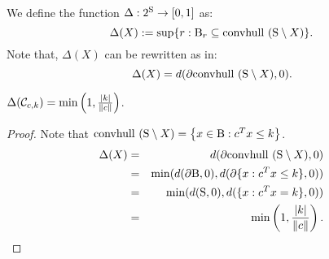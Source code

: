 
We define the function $\Delta : 2^{\text{S}} \to [0,1]$ as:
\begin{equation}\label{shrinkage}
\Delta(X) := \sup \{r: \text{B}_r \subseteq \mbox{convhull }(\text{S} \setminus X)\}.\end{equation}
Note that, $\Delta(X)$ can be rewritten as in:
\begin{equation}\label{shrinkage2}
\Delta(X) =  d(\partial  \mbox{convhull }(\text{S} \setminus X), 0).
\end{equation}


\begin{lemma}\label{lemma:delta2}$\Delta(\mathcal{C}_{c,k}) = \min\left(1, \frac{|k|}{\|c\|}\right)$.
\end{lemma}

\begin{proof}
Note that $\mbox{convhull }(\text{S} \setminus X)= \left\{x \in \text{B} : c^Tx \leq k \right\}$.
\begin{eqnarray}
\nonumber \Delta(X) &=& d(\partial \mbox{convhull }(\text{S} \setminus X), 0) \\
\nonumber &=& \min(d(\partial \text{B}, 0), d(\partial\{x : c^Tx \leq k\}, 0)) \\
\nonumber &=& \min(d(\text{S}, 0), d(\{x : c^Tx = k\}, 0)) \\
\nonumber &=& \min\left(1, \frac{|k|}{\|c\|}\right).
\end{eqnarray}
\end{proof}
%

